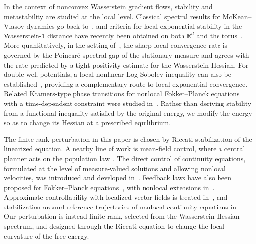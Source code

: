 \documentclass[11pt]{article}
\numberwithin{equation}{section}
\theoremstyle{definition}
\newcommand{\R}{\mathbb{R}}
\begin{document}
In the context of nonconvex Wasserstein gradient flows, stability and metastability are studied at the local level. 
Classical spectral results for McKean--Vlasov dynamics go back to~\cite{Tamura1984}, and criteria for local exponential stability in the Wasserstein-$1$ distance have recently been obtained on both $\R^d$ and the torus~\cite{Cormier2025}.
More quantitatively, in the setting of~\cite{WangChizat2026}, the sharp local convergence rate is governed by the Poincar\'e spectral gap of the stationary measure and agrees with the rate predicted by a tight positivity estimate for the Wasserstein Hessian.
For double-well potentials, a local nonlinear Log-Sobolev inequality can also be established~\cite{MonmarcheReygner2025}, providing a complementary route to local exponential convergence. 
Related Kramers-type phase transitions for nonlocal Fokker--Planck equations with a time-dependent constraint were studied in~\cite{HerrmannNiethammerVelazquez2014}.
Rather than deriving stability from a functional inequality satisfied by the original energy, we modify the energy so as to change its Hessian at a prescribed equilibrium.

The finite-rank perturbation in this paper is chosen by Riccati stabilization of the linearized equation.
A nearby line of work is mean-field control, where a central planner acts on the population law~\cite{HuangCainesMalhame2012,BensoussanFrehseYam2013,FornasierSolombrino2014,AlbiEtAl2017,CarmonaDelarue2018I}.
The direct control of continuity equations, formulated at the level of measure-valued solutions and allowing nonlocal velocities, was introduced and developed in~\cite{PiccoliRossi2013,PiccoliRossi2014}.
Feedback laws have also been proposed for Fokker--Planck equations~\cite{BreitenKunischPfeiffer2018}, with nonlocal extensions in~\cite{KaliseMoschenPavliotis2025}.
Approximate controllability with localized vector fields is treated in~\cite{DuprezMoranceyRossi2019}, and stabilization around reference trajectories of nonlocal continuity equations in~\cite{PogodaevRossi2024}.
Our perturbation is instead finite-rank, selected from the Wasserstein Hessian spectrum, and designed through the Riccati equation to change the local curvature of the free energy.
\end{document}
